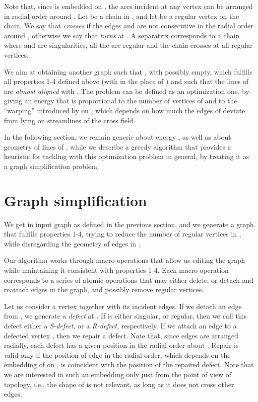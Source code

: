 \documentclass[11pt,a4paper]{article}
\begin{document}
Note that, since  is embedded on , the arcs incident at any vertex  can be arranged in radial order around .
Let  be a chain in , and let  be a regular vertex on the chain. 
We say that  \emph{crosses}  if the edges  and   are not consecutive in the radial order around , otherwise we say that  \emph{turns} at .
A separatrix corresponds to a chain  where  and  are singularities, all the  are regular and the chain crosses at all regular vertices.

We aim at obtaining another graph  such that , with  possibly empty, which fulfills all properties 1-4 defined above (with  in the place of ) and such that the lines of  are \emph{almost aligned} with . 
The problem can be defined as an optimization one, by giving an energy  that is proportional to the number of vertices of  and to the ``warping'' introduced by  on , which depends on how much the edges of  deviate from lying on streamlines of the cross field.

In the following section, we remain generic about energy , as well as about geometry of lines of , while we describe a greedy algorithm that provides a heuristic for tackling with this optimization problem in general, by treating it as a graph simplification problem. 




\section{Graph simplification}
\label{sec:simpl}

We get in input graph   as defined in the previous section, and we generate a graph  that fulfills properties 1-4, trying to reduce the number of regular vertices in , while disregarding the geometry of edges in . 

Our algorithm works through macro-operations that allow us editing the graph while maintaining it consistent with properties 1-4.
Each macro-operation corresponds to a series of atomic operations that may either delete, or detach and reattach edges in the graph, and possibly remove regular vertices. 

Let us consider a vertex  together with its incident edges. 
If we detach an edge from , we generate a \emph{defect} at .
If  is either singular, or regular, then we call this defect either a \emph{S-defect,} or a \emph{R-defect,} respectively. 
If we attach an edge  to a defected vertex , then we repair a defect.
Note that, since edges are arranged radially, each defect has a given position in the radial order about .
Repair is valid only if the position of edge  in the radial order, which depends on the embedding of  on , is coincident with the position of the repaired defect. 
Note that we are interested in such an embedding only just from the point of view of topology, i.e., the shape of  is not relevant, as long as it does not cross other edges. 
\end{document}
